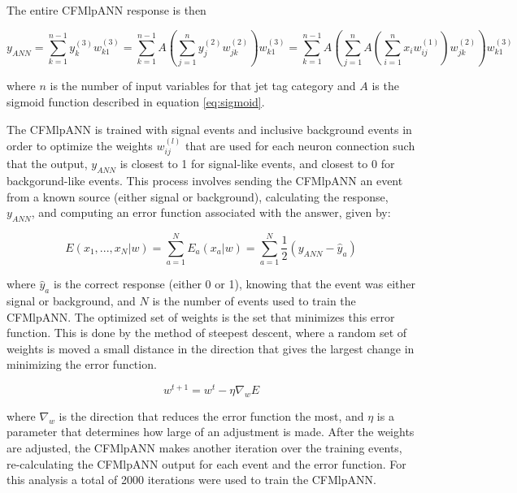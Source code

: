 \noindent The entire CFMlpANN response is then 

\begin{equation}\label{eq:ann_output}
y_{ANN} = \sum_{k=1}^{n-1}y_{k}^{(3)}w_{k1}^{(3)} = \sum_{k=1}^{n-1}A\left(
\sum_{j=1}^{n}y_{j}^{(2)}w_{jk}^{(2)}\right)w_{k1}^{(3)} = \sum_{k=1}^{n-1}A\left(
\sum_{j=1}^{n}A\left(\sum_{i=1}^{n}x_{i}w_{ij}^{(1)}\right)w_{jk}^{(2)}\right)w_{k1}^{(3)}
\end{equation}
 
\noindent where $n$ is the number of input variables for that jet tag
category and $A$ is the sigmoid function described in equation
\ref{eq:sigmoid}.  

\par The CFMlpANN is trained with \ttH signal events and inclusive
\ttjets background events in order to optimize the weights
$w_{ij}^{(l)}$ that are used for each neuron connection such that the
output, $y_{ANN}$ is closest to 1 for signal-like events, and closest
to 0 for backgorund-like events.  This process involves sending the
CFMlpANN an event from a known source (either signal or background),
calculating the response, $y_{ANN}$, and computing an error function
associated with the answer, given by:

\begin{equation}\label{eq:ann_err}
E(x_{1},...,x_{N}|w) = \sum_{a=1}^{N}E_{a}(x_{a}|w) =
\sum_{a=1}^{N}\frac{1}{2}(y_{ANN} - \hat{y}_{a})
\end{equation}

\noindent where $\hat{y}_{a}$ is the correct response (either 0 or 1),
knowing that the event was either signal or background, and $N$ is the
number of events used to train the CFMlpANN.  The optimized set of
weights is the set that minimizes this error function.  This is done
by the method of steepest descent, where a random set of weights is
moved a small distance in the direction that gives the largest change
in minimizing the error function.  

\begin{equation}\label{eq:ann_reweight}
w^{t+1} = w^{t} - \eta\nabla_{w}E
\end{equation}

\noindent where $\nabla_{w}$ is the direction that reduces the error
function the most, and $\eta$ is a parameter that determines how large
of an adjustment is made.  After the weights are adjusted, the
CFMlpANN makes another iteration over the training events,
re-calculating the CFMlpANN output for each event and the error
function.  For this analysis a total of 2000 iterations were used to
train the CFMlpANN.  

